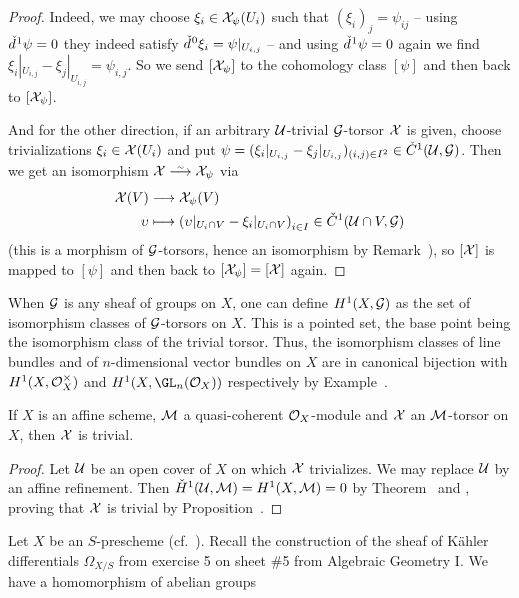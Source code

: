 \documentclass[a4paper,parskip=half,numbers=enddot, DIV=12]{scrreprt}
\begin{document}
\begin{proof}
	Indeed, we may choose $\xi_i\in\mathcal{X}_\psi(U_i)$ such that $(\xi_i)_j=\psi_{ij}$ -- using $\check{d}\hspace{0.06125em}^1\psi=0$ they indeed satisfy $\check{d}\hspace{0.06125em}^0\xi_i=\psi|_{U_{i,j}}$ -- and using $\check{d}\hspace{0.06125em}^1\psi=0$ again we find $\xi_i|_{U_{i,j}}-\xi_j|_{U_{i,j}}=\psi_{i,j}$. So we send $[\mathcal{X}_\psi]$ to the cohomology class $[\psi]$ and then back to $[\mathcal{X}_\psi]$.
	
	And for the other direction, if an arbitrary $\mathcal{U}$-trivial $\mathcal{G}$-torsor $\mathcal{X}$ is given, choose trivializations $\xi_i\in\mathcal{X}(U_i)$ and put $\psi=(\xi_i|_{U_{i,j}}-\xi_j|_{U_{i,j}})_{(i,j)\in I^2}\in\check{C}^1(\mathcal{U},\mathcal{G})$. Then we get an isomorphism $\Xx\isomorphism\Xx_\psi$ via
	\begin{align*}
		\Xx(V)&\morphism \Xx_\psi(V)\\
		\upsilon &\longmapsto \left(\upsilon|_{U_i\cap V}-\xi_i|_{U_i\cap V}\right)_{i\in I}\in\check{C}^1(\Uu\cap V,\Gg)
	\end{align*}
	(this is a morphism of $\mathcal{G}$-torsors, hence an isomorphism by Remark~), so $[\mathcal{X}]$ is mapped to $[\psi]$ and then back to $[\mathcal{X}_\psi]=[\mathcal{X}]$ again.
\end{proof}
\begin{rem*}
	When $\mathcal{G}$ is any sheaf of groups on $X$, one can define $H^1(X,\mathcal{G})$ as the set of isomorphism classes of $\mathcal{G}$-torsors on $X$. This is a pointed set, the base point being the isomorphism class of the trivial torsor. Thus, the isomorphism classes of line bundles and of $n$-dimensional vector bundles on $X$ are in canonical bijection with $H^1(X,\mathcal{O}_X^\times)$ and $H^1(X,\GL_n(\Oo_X))$ respectively by Example~.
\end{rem*}
\begin{cor}
	If $X$ is an affine scheme, $\mathcal{M}$ a quasi-coherent $\mathcal{O}_X$-module and $\mathcal{X}$ an $\mathcal{M}$-torsor on $X$, then $\mathcal{X}$ is trivial.
\end{cor}
\begin{proof}
	Let $\mathcal{U}$ be an open cover of $X$ on which $\mathcal{X}$ trivializes. We may replace $\mathcal{U}$ by an affine refinement. Then $\check{H}^1(\mathcal{U},\mathcal{M})=H^1(X,\mathcal{M})=0$ by Theorem~ and , proving that $\mathcal{X}$ is trivial by Proposition~.
\end{proof}
Let $X$ be an $S$-prescheme (cf.\ \cite[Definition~1.5.7]{alggeo1}). Recall the construction of the sheaf of Kähler differentials $\Omega_{X/S}$ from exercise 5 on sheet \#5 from Algebraic Geometry I. We have a homomorphism of abelian groups
\end{document}
